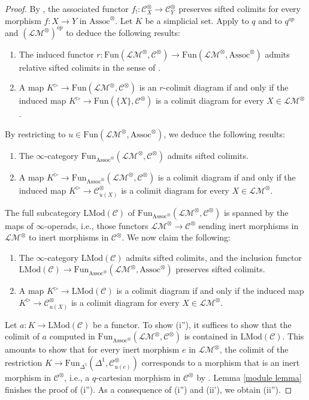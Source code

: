 \documentclass[10pt]{amsart}
\theoremstyle{definition}
\numberwithin{equation}{section}
\newcommand{\cC}{\mathcal{C}}
\newcommand{\Fun}{\mathrm{Fun}}
\newcommand{\LMod}{\mathrm{LMod}}
\newcommand{\Assoc}{\mathrm{Assoc}}
\newcommand{\LM}{\mathcal{LM}}
\begin{document}
\begin{proof}
By \cite[Lemma 3.2.3.7]{HA},
the associated functor $f_!\colon \cC_X^{\otimes} \to \cC_Y^{\otimes}$ preserves sifted colimits for every morphism $f\colon X\to Y$ in $\Assoc^\otimes$.
Let $K$ be a simplicial set.
Apply \cite[Corollary 4.3.1.11]{HTT} to $q$ and \cite[Lemma 3.2.2.9]{HA} to $q^{op}$ and $(\LM^{\otimes})^{op}$ to deduce the following results:
\begin{enumerate}
\item[(i)]
The induced functor
$
r\colon
\Fun(\LM^\otimes,\cC^\otimes)\to \Fun(\LM^\otimes,\Assoc^\otimes)
$
admits relative sifted colimits in the sense of \cite[Definition 4.3.1.1]{HTT}.
\item[(ii)]
A map $K^\rhd\to \Fun(\LM^\otimes,\cC^\otimes)$ is an $r$-colimit diagram if and only if the induced map $K^\rhd\to \Fun(\{X\},\cC^\otimes)$ is a colimit diagram for every $X\in \LM^\otimes$.
\end{enumerate}
By restricting to $u\in \Fun(\LM^\otimes,\Assoc^\otimes)$,
we deduce the following results:
\begin{enumerate}
\item[(i')]
The $\infty$-category $\Fun_{\Assoc^\otimes}(\LM^\otimes,\cC^\otimes)$ admits sifted colimits.
\item[(ii')]
A map $K^\rhd\to \Fun_{\Assoc^\otimes}(\LM^\otimes,\cC^\otimes)$ is a colimit diagram if and only if the induced map $K^\rhd\to \cC_{u(X)}^\otimes$ is a colimit diagram for every $X\in \LM^\otimes$.
\end{enumerate}
The full subcategory $\LMod(\cC)$ of $\Fun_{\Assoc^\otimes}(\LM^\otimes,\cC^\otimes)$ is spanned by the maps of $\infty$-operads,
i.e.,
those functors $\LM^\otimes\to\cC^\otimes$ sending inert morphisms in $\LM^\otimes$ to inert morphisms in $\cC^\otimes$.
We now claim the following:
\begin{enumerate}
\item[(i'')]
The $\infty$-category $\LMod(\cC)$ admits sifted colimits,
and the inclusion functor $\LMod(\cC)\to \Fun_{\Assoc^\otimes}(\LM^\otimes,\Assoc^\otimes)$ preserves sifted colimits.
\item[(ii'')]
A map $K^\rhd\to \LMod(\cC)$ is a colimit diagram if and only if the induced map $K^\rhd\to \cC_{u(X)}^\otimes$ is a colimit diagram for every $X\in \LM^\otimes$.
\end{enumerate}
Let $a\colon K\to \LMod(\cC)$ be a functor.
To show (i''),
it suffices to show that the colimit of $a$ computed in $\Fun_{\Assoc^\otimes}(\LM^\otimes,\cC^\otimes)$ is contained in $\LMod(\cC)$.
This amounts to show that for every inert morphism $e$ in $\LM^\otimes$,
the colimit of the restriction $K\to \Fun_{\Delta^1}(\Delta^1,\cC_{u(e)}^\otimes)$ corresponds to a morphism that is an inert morphism in $\cC^\otimes$,
i.e., a $q$-cartesian morphism in $\cC^\otimes$ by \cite[Proposition 2.1.2.22]{HA}.
Lemma \ref{module lemma} finishes the proof of (i'').
As a consequence of (i'') and (ii'),
we obtain (ii'').
\end{proof}
\end{document}

